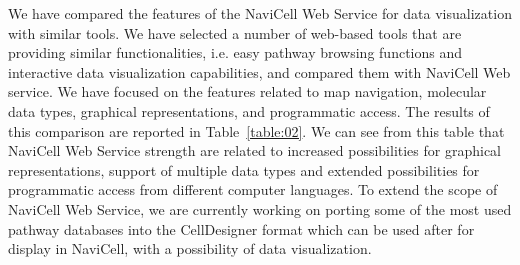 \documentclass[a4,center,fleqn]{NAR}
\begin{document}
We have compared the features of the NaviCell Web Service for data visualization
with similar tools. We have selected a number of web-based tools that are providing
similar functionalities, i.e. easy pathway browsing functions and interactive data
visualization capabilities, and compared them with NaviCell Web service. We have focused on the features
related to map navigation, molecular data types, graphical representations,
and programmatic access. The results of this comparison are reported in Table~\ref{table:02}. 
We can see from this table that NaviCell Web Service strength are related to
increased possibilities for graphical representations, support of multiple
data types and extended possibilities for programmatic access from different
computer languages.  To extend the scope of NaviCell Web Service, we are
currently working on porting some of the most used pathway databases into the
CellDesigner format which can be used after for display in NaviCell, with a
possibility of data visualization.
\end{document}
